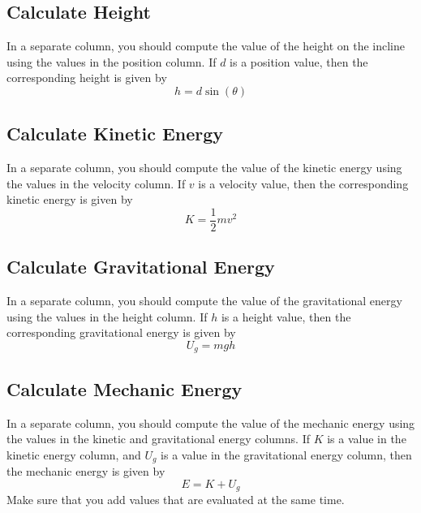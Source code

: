 \subsection{Calculate Height}
In a separate column, you should compute the value of the height on the incline using the values in the position column. If $d$ is a position value, then the corresponding height is given by
\begin{equation}
    h = d \sin{(\theta)}
\end{equation}
\subsection{Calculate Kinetic Energy}
In a separate column, you should compute the value of the kinetic energy using the values in the velocity column. If $v$ is a velocity value, then the corresponding kinetic energy is given by
\begin{equation}
    K = \frac{1}{2} m v^{2}
\end{equation}
\subsection{Calculate Gravitational Energy}
In a separate column, you should compute the value of the gravitational energy using the values in the height column. If $h$ is a height value, then the corresponding gravitational energy is given by
\begin{equation}
    U_{g} = m g h
\end{equation}
\subsection{Calculate Mechanic Energy}
In a separate column, you should compute the value of the mechanic energy using the values in the kinetic and gravitational energy columns. If $K$ is a value in the kinetic energy column, and $U_{g}$ is a value in the gravitational energy column, then the mechanic energy is given by
\begin{equation}
    E = K + U_{g}
\end{equation}
Make sure that you add values that are evaluated at the same time.
